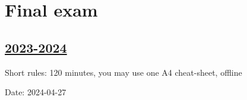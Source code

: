 


\newpage
\thispagestyle{empty}
\section{Final exam}

\subsection[2023-2024]{\hyperref[sec:sol_kr_04_2023_2024]{2023-2024}}
\label{sec:kr_04_2023_2024} %

Short rules: 120 minutes, you may use one A4 cheat-sheet, offline

Date: 2024-04-27

